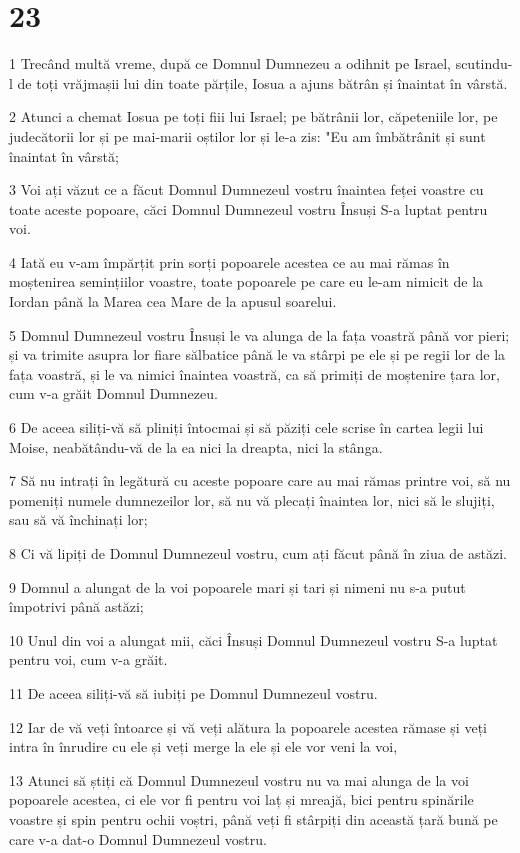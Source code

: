\chapter{23}

\par 1 Trecând multă vreme, după ce Domnul Dumnezeu a odihnit pe Israel, scutindu-l de toți vrăjmașii lui din toate părțile, Iosua a ajuns bătrân și înaintat în vârstă.
\par 2 Atunci a chemat Iosua pe toți fiii lui Israel; pe bătrânii lor, căpeteniile lor, pe judecătorii lor și pe mai-marii oștilor lor și le-a zis: "Eu am îmbătrânit și sunt înaintat în vârstă;
\par 3 Voi ați văzut ce a făcut Domnul Dumnezeul vostru înaintea feței voastre cu toate aceste popoare, căci Domnul Dumnezeul vostru Însuși S-a luptat pentru voi.
\par 4 Iată eu v-am împărțit prin sorți popoarele acestea ce au mai rămas în moștenirea semințiilor voastre, toate popoarele pe care eu le-am nimicit de la Iordan până la Marea cea Mare de la apusul soarelui.
\par 5 Domnul Dumnezeul vostru Însuși le va alunga de la fața voastră până vor pieri; și va trimite asupra lor fiare sălbatice până le va stârpi pe ele și pe regii lor de la fața voastră, și le va nimici înaintea voastră, ca să primiți de moștenire țara lor, cum v-a grăit Domnul Dumnezeu.
\par 6 De aceea siliți-vă să pliniți întocmai și să păziți cele scrise în cartea legii lui Moise, neabătându-vă de la ea nici la dreapta, nici la stânga.
\par 7 Să nu intrați în legătură cu aceste popoare care au mai rămas printre voi, să nu pomeniți numele dumnezeilor lor, să nu vă plecați înaintea lor, nici să le slujiți, sau să vă închinați lor;
\par 8 Ci vă lipiți de Domnul Dumnezeul vostru, cum ați făcut până în ziua de astăzi.
\par 9 Domnul a alungat de la voi popoarele mari și tari și nimeni nu s-a putut împotrivi până astăzi;
\par 10 Unul din voi a alungat mii, căci Însuși Domnul Dumnezeul vostru S-a luptat pentru voi, cum v-a grăit.
\par 11 De aceea siliți-vă să iubiți pe Domnul Dumnezeul vostru.
\par 12 Iar de vă veți întoarce și vă veți alătura la popoarele acestea rămase și veți intra în înrudire cu ele și veți merge la ele și ele vor veni la voi,
\par 13 Atunci să știți că Domnul Dumnezeul vostru nu va mai alunga de la voi popoarele acestea, ci ele vor fi pentru voi laț și mreajă, bici pentru spinările voastre și spin pentru ochii voștri, până veți fi stârpiți din această țară bună pe care v-a dat-o Domnul Dumnezeul vostru.
